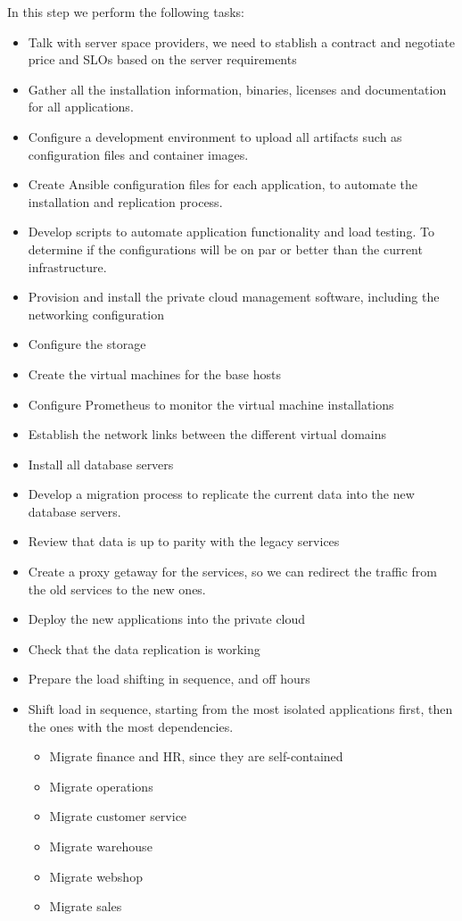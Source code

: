 \documentclass{llncs}
\begin{document}
In this step we perform the following tasks:
\begin{itemize}

  \item  Talk with server space providers, we need to stablish a contract and negotiate price and SLOs based on the server requirements
  \item Gather all the installation information, binaries, licenses and documentation for all applications.
  \item Configure a development environment to upload all artifacts such as configuration files and container images.
  \item Create Ansible configuration files for each application, to automate the installation and replication process.
  \item Develop scripts to automate application functionality and load testing. To determine if the configurations will be on par or better than the current infrastructure.
  \item Provision and install the private cloud management software, including the networking configuration
  \item Configure the storage
  \item Create the virtual machines for the base hosts
  \item Configure Prometheus to monitor the virtual machine installations
  \item Establish the network links between the different virtual domains
  \item Install all database servers
  \item Develop a migration process to replicate the current data into the new database servers.
  \item Review that data is up to parity with the legacy services
  \item Create a proxy getaway for the services, so we can redirect the traffic from the old services to the new ones.
  \item Deploy the new applications into the private cloud
  \item Check that the data replication is working
  \item Prepare the load shifting in sequence, and off hours
  \item Shift load in sequence, starting from the most isolated applications first, then the ones with the most dependencies.
        \begin{itemize}
          \item Migrate finance and HR, since they are self-contained
          \item Migrate operations
          \item Migrate customer service
          \item Migrate warehouse
          \item Migrate webshop
          \item Migrate sales
        \end{itemize}
\end{itemize}
\end{document}
